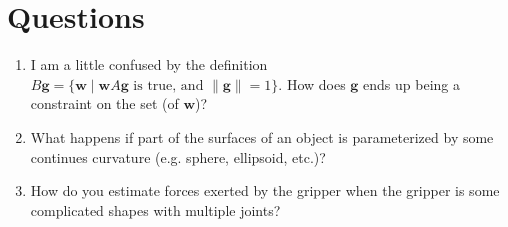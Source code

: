\documentclass[10pt, twocolumn]{article}
\begin{document}
\section{Questions}
\begin{enumerate}
    \item I am a little confused by the definition 
        $B\bm{g} = \{\bm{w}\; |\; \bm{w}A\bm{g} \text{ is true, and } \|\bm{g}\| = 1\}$.
        How does $\bm{g}$ ends up being a constraint on the set (of $\bm{w}$)?

    \item What happens if part of the surfaces of an object is 
        parameterized by some continues curvature (e.g. sphere, ellipsoid, etc.)?

    \item How do you estimate forces exerted by the gripper when the gripper 
        is some complicated shapes with multiple joints?
\end{enumerate}
\end{document}

